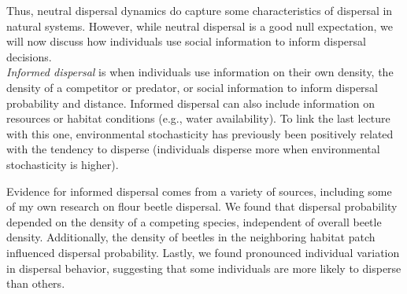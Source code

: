 \documentclass[12pt]{article}
\begin{document}
Thus, neutral dispersal dynamics do capture some characteristics of dispersal in natural systems. However, while neutral dispersal is a good null expectation, we will now discuss how individuals use social information to inform dispersal decisions. \\






\textit{Informed dispersal} is when individuals use information on their own density, the density of a competitor or predator, or social information to inform dispersal probability and distance. Informed dispersal can also include information on resources or habitat conditions (e.g., water availability). To link the last lecture with this one, environmental stochasticity has previously been positively related with the tendency to disperse (individuals disperse more when environmental stochasticity is higher).



Evidence for informed dispersal comes from a variety of sources, including some of my own research on flour beetle dispersal. We found that dispersal probability depended on the density of a competing species, independent of overall beetle density. Additionally, the density of beetles in the neighboring habitat patch influenced dispersal probability. Lastly, we found pronounced individual variation in dispersal behavior, suggesting that some individuals are more likely to disperse than others. \\











\end{document}
